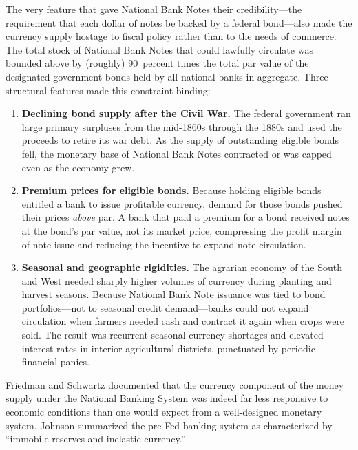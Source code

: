 \documentclass[12pt]{article}
\begin{document}
The very feature that gave National Bank Notes their credibility---the requirement
that each dollar of notes be backed by a federal bond---also made the currency
supply hostage to fiscal policy rather than to the needs of commerce.  The total
stock of National Bank Notes that could lawfully circulate was bounded above by
(roughly) 90~percent times the total par value of the designated government bonds held
by all national banks in aggregate.  Three structural features made this constraint
binding:

\begin{enumerate}
  \item \textbf{Declining bond supply after the Civil War.}  The federal government
    ran large primary surpluses from the mid-1860s through the 1880s and used the
    proceeds to retire its war debt.  As the supply of outstanding eligible bonds
    fell, the monetary base of National Bank Notes contracted or was capped even as
    the economy grew.

  \item \textbf{Premium prices for eligible bonds.}  Because holding eligible bonds
    entitled a bank to issue profitable currency, demand for those bonds pushed
    their prices \emph{above} par.  A bank that paid a premium for a bond received
    notes at the bond's par value, not its market price, compressing the profit
    margin of note issue and reducing the incentive to expand note circulation.

  \item \textbf{Seasonal and geographic rigidities.}  The agrarian economy of the
    South and West needed sharply higher volumes of currency during planting and
    harvest seasons.  Because National Bank Note issuance was tied to bond
    portfolios---not to seasonal credit demand---banks could not expand circulation
    when farmers needed cash and contract it again when crops were sold.  The result
    was recurrent seasonal currency shortages and elevated interest rates in interior
    agricultural districts, punctuated by periodic financial panics.
\end{enumerate}

Friedman and Schwartz \citep{friedman-schwartz1963} documented that the currency
component of the money supply under the National Banking System was indeed
far less responsive to economic conditions than one would expect from a well-designed
monetary system.  Johnson \citep{johnson1999} summarized the pre-Fed banking system
as characterized by ``immobile reserves and inelastic currency.''
\end{document}
